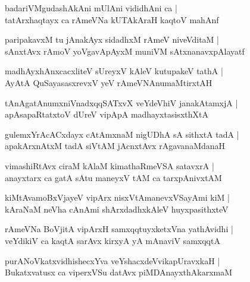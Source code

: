 \begin{shloka}
badariVMgudashAkAni mUlAni vididhAni ca |\\
tatArxhaqtayx ca rAmeVNa kUTAkAraH kaqtoV mahAnf
\end{shloka}

\begin{shloka}
paripakavxM tu jAnakAyx sidadhxM rAmeV niveVditaM |\\
sAnxtAvx rAmoV yoVgavApAyxM muniVM sAtxnanavxpAlayatf 
\end{shloka}

\begin{shloka}
madhAyxhAnxcacxliteV sUreyxV kAleV kutupakeV tathA |\\
AyAtA QuSayasasxrevxV yeV rAmeVNAnumaMtirxtAH 
\end{shloka}

\begin{shloka}
tAnAgatAnumxniVnadxqqSATxvX veYdeVhiV janakAtamxjA |\\
apAsapaRtatxtoV dUreV vipApA madhayxtasisxthXtA 
\end{shloka}

\begin{shloka}
gulemxYrAcACxdayx cAtAmxnaM nigUDhA sA sithxtA tadA |\\
apakArxnAtxM tadA siVtAM jAcnxtAvx rAgavanaMdanaH 
\end{shloka}

\begin{shloka}
vimashiRtAvx ciraM kAlaM kimathaRmeVSA satavxrA |\\
anayxtarx ca gatA sAtu maneyxV tAM ca tarxpAnivxtAM 
\end{shloka}

\begin{shloka}
kiMtAvamoBxVjayeV vipArx nisxVtAmanevxVSayAmi kiM |\\
kAraNaM neVha cAnAmi shArxdadhxkAleV huyxpasithxteV 
\end{shloka}

\begin{shloka}
rAmeVNa BoVjitA vipArxH samxqqtuyxketxVna yathAvidhi |\\
veYdikiV ca kaqtA sarAvx kirxyA yA mAnaviV samxqqtA 
\end{shloka}

\begin{shloka}
purANoVkatxvidhishecxYva veYshacxdeVvikapUravxkaH |\\
Bukatxvatusx ca viperxVSu datAvx piMDAnayxthAkarxmaM 
\end{shloka}

